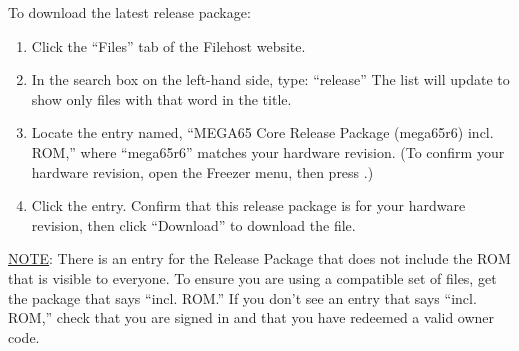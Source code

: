 \begin{center}
\end{center}

To download the latest release package:

\begin{enumerate}
  \item Click the ``Files'' tab of the Filehost website.
  \item In the search box on the left-hand side, type: ``release'' The list will update to show only files with that word in the title.
  \item Locate the entry named, ``MEGA65 Core Release Package (mega65r6) incl. ROM,'' where ``mega65r6'' matches your hardware revision. (To confirm your hardware revision, open the Freezer menu, then press .)
  \item Click the entry. Confirm that this release package is for your hardware revision, then click ``Download'' to download the file.
\end{enumerate}

\underline{NOTE}: There is an entry for the Release Package that does not include the ROM that is visible to everyone. To ensure you are using a compatible set of files, get the package that says ``incl. ROM.'' If you don't see an entry that says ``incl. ROM,'' check that you are signed in and that you have redeemed a valid owner code.

\begin{center}
\end{center}

